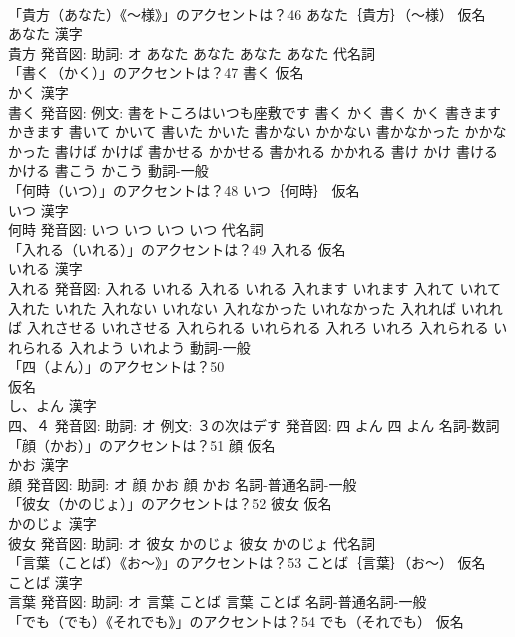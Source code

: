 \documentclass[8pt]{extreport}
\begin{document}
\begin{CJK}{UTF8}{min}
\\	「貴方（あなた）《〜様》」のアクセントは？46	あなた｛貴方｝（〜様） 仮名　
\\	あなた 漢字　
\\	貴方 発音図: 助詞: オ	あなた あなた		あなた あなた				代名詞 
\\	「書く（かく）」のアクセントは？47	書く 仮名　
\\	かく 漢字　
\\	書く 発音図: 例文: 書をトころはいつも座敷です	書く かく		書く かく 書きます かきます 書いて かいて 書いた かいた 書かない かかない 書かなかった かかなかった 書けば かけば 書かせる かかせる 書かれる かかれる 書け かけ 書ける かける 書こう かこう				動詞-一般 
\\	「何時（いつ）」のアクセントは？48	いつ｛何時｝ 仮名　
\\	いつ 漢字　
\\	何時 発音図:	いつ いつ		いつ いつ				代名詞 
\\	「入れる（いれる）」のアクセントは？49	入れる 仮名　
\\	いれる 漢字　
\\	入れる 発音図:	入れる いれる		入れる いれる 入れます いれます 入れて いれて 入れた いれた 入れない いれない 入れなかった いれなかった 入れれば いれれば 入れさせる いれさせる 入れられる いれられる 入れろ いれろ 入れられる いれられる 入れよう いれよう				動詞-一般 
\\	「四（よん）」のアクセントは？50	
\\	仮名　
\\	し、よん 漢字　
\\	四、４ 発音図: 助詞: オ 例文: ３の次はデす 発音図:	四 よん		四 よん				名詞-数詞 
\\	「顔（かお）」のアクセントは？51	顔 仮名　
\\	かお 漢字　
\\	顔 発音図: 助詞: オ	顔 かお		顔 かお				名詞-普通名詞-一般 
\\	「彼女（かのじょ）」のアクセントは？52	彼女 仮名　
\\	かのじょ 漢字　
\\	彼女 発音図: 助詞: オ	彼女 かのじょ		彼女 かのじょ				代名詞 
\\	「言葉（ことば）《お〜》」のアクセントは？53	ことば｛言葉｝（お〜） 仮名　
\\	ことば 漢字　
\\	言葉 発音図: 助詞: オ	言葉 ことば		言葉 ことば				名詞-普通名詞-一般 
\\	「でも（でも）《それでも》」のアクセントは？54	でも（それでも） 仮名　

\end{CJK}
\end{document}
